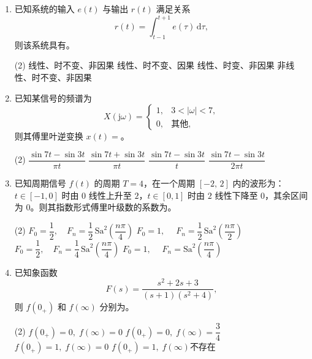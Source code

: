 \documentclass[10pt,a4paper]{ctexart}
\newcommand{\fillblank}{\underline{\hspace{1.5cm}}}
\begin{document}
\begin{enumerate}[label=\arabic*.,leftmargin=*]

\item 已知系统的输入 $e(t)$ 与输出 $r(t)$ 满足关系
  \[
  r(t)=\int_{t-1}^{t+1} e(\tau)\,\mathrm{d}\tau,
  \]
  则该系统具有\fillblank。

  \begin{tasks}(2)
    \task 线性、时不变、非因果
    \task 线性、时不变、因果
    \task 线性、时变、非因果
    \task 非线性、时不变、非因果
  \end{tasks}

\item 已知某信号的频谱为
  \[
  X(\mathrm{j}\omega)=
  \begin{cases}
  1, & 3 < |\omega| < 7,\\[2pt]
  0, & \text{其他},
  \end{cases}
  \]
  则其傅里叶逆变换 $x(t)=$\fillblank。

  \begin{tasks}(2)
    \task $\dfrac{\sin 7t-\sin 3t}{\pi t}$
    \task $\dfrac{\sin 7t+\sin 3t}{\pi t}$
    \task $\dfrac{\sin 7t-\sin 3t}{t}$
    \task $\dfrac{\sin 7t-\sin 3t}{2\pi t}$
  \end{tasks}

\item 已知周期信号 $f(t)$ 的周期 $T=4$，在一个周期 $[-2,\,2]$ 内的波形为：$t\in[-1,0]$ 时由 $0$ 线性上升至 $2$，$t\in[0,1]$ 时由 $2$ 线性下降至 $0$，其余区间为 $0$。则其指数形式傅里叶级数的系数为\fillblank。

  \begin{tasks}(2)
    \task $F_0=\dfrac12,\quad F_n=\dfrac12\,\mathrm{Sa}^2\!\left(\dfrac{n\pi}{4}\right)$
    \task $F_0=1,\quad\; F_n=\dfrac12\,\mathrm{Sa}^2\!\left(\dfrac{n\pi}{2}\right)$
    \task $F_0=\dfrac12,\quad F_n=\dfrac14\,\mathrm{Sa}^2\!\left(\dfrac{n\pi}{4}\right)$
    \task $F_0=1,\quad\; F_n=\mathrm{Sa}^2\!\left(\dfrac{n\pi}{4}\right)$
  \end{tasks}

\item 已知象函数
  \[
  F(s)=\frac{s^2+2s+3}{(s+1)(s^2+4)},
  \]
  则 $f(0_+)$ 和 $f(\infty)$ 分别为\fillblank。

  \begin{tasks}(2)
    \task $f(0_+)=0,\; f(\infty)=0$
    \task $f(0_+)=0,\; f(\infty)=\dfrac34$
    \task $f(0_+)=1,\; f(\infty)=0$
    \task $f(0_+)=1,\; f(\infty)\text{不存在}$
  \end{tasks}

\end{enumerate}
\end{document}
